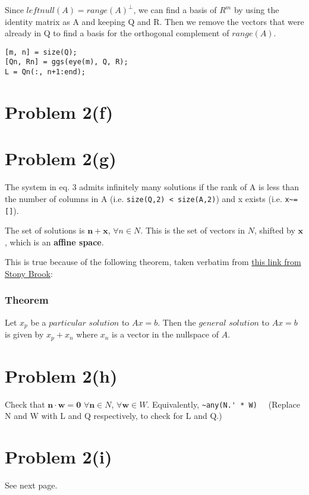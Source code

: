 \documentclass{article}
\begin{document}
Since $leftnull(A) = range(A)^{\perp}$, we can find a basis of $R^m$ by using the identity matrix as A and keeping Q and R. Then we remove the vectors that were already in Q to find a basis for the orthogonal complement of $range(A)$.

\begin{verbatim}
[m, n] = size(Q);
[Qn, Rn] = ggs(eye(m), Q, R);
L = Qn(:, n+1:end);
\end{verbatim}

\section*{Problem 2(f)}


\section*{Problem 2(g)}

The system in eq. 3 admits infinitely many solutions if the rank of A is less than the number of columns in A (i.e. \verb#size(Q,2) < size(A,2)#) and x exists (i.e. \verb#x~=[]#).

The set of solutions is $ \mathbf{n} + \mathbf{x}$, $ \forall n \in N $. This is the set of vectors in $N$, shifted by $\mathbf{x}$, which is an \textbf{affine space}.

This is true because of the following theorem, taken verbatim from \href{https://www.math.stonybrook.edu/~badger/mat211f12/solver2.pdf}{this link from Stony Brook}:

\subsubsection*{Theorem}

Let $x_p$ be a $particular $ $solution$ to $Ax = b$. Then the $general$ $ solution$ to $Ax = b$ is given by $x_p + x_n$ where $x_n$ is a vector in the nullspace of $A$.



\section*{Problem 2(h)}


Check that $\mathbf{n} \cdot \mathbf{w} = \mathbf{0}$ $ \forall \mathbf{n} \in N$, $ \forall \mathbf{w} \in W$. Equivalently, \verb#~any(N.' * W)  # (Replace N and W with L and Q respectively, to check for L and Q.)

\section*{Problem 2(i)}

See next page.

\end{document}
